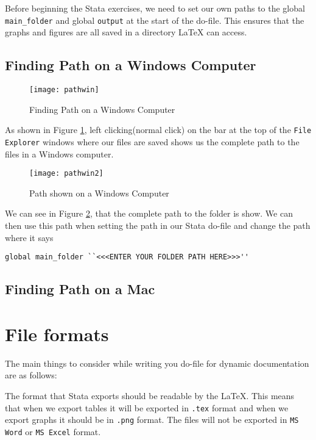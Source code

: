 \documentclass[]{article}
\begin{document}
Before beginning the Stata exercises, we need to set our own paths to the global \texttt{main\_folder} and global \texttt{output} at the start of the do-file. This ensures that the graphs and figures are all saved in a directory {\LaTeX} can access. 

\subsection*{Finding Path on a Windows Computer}



\begin{figure}[H]
	\centering
	\texttt{[image: pathwin]}
	\caption{Finding Path on a Windows Computer}
	\label{fig:pathwin}
\end{figure}

As shown in Figure \ref{fig:pathwin}, left clicking(normal click) on the bar at the top of the \texttt{File Explorer} windows where our files are saved shows us the complete path to the files in a Windows computer. \\

\begin{figure}[H]
	\centering
	\texttt{[image: pathwin2]}
	\caption{Path shown on a Windows Computer}
	\label{fig:pathwin2}
\end{figure}

We can see in Figure \ref{fig:pathwin2}, that the complete path to the folder is show. We can then use this path when setting the path in our Stata do-file and change the path where it says \begin{verbatim}
global main_folder ``<<<ENTER YOUR FOLDER PATH HERE>>>''
\end{verbatim} 

\subsection*{Finding Path on a Mac}


\section*{File formats}
The main things to consider while writing you do-file for dynamic documentation are as follows: 

The format that Stata exports should be readable by the {\LaTeX}. This means that when we export tables it will be exported in \texttt{.tex} format and when we export graphs it should be in \texttt{.png} format. 
The files will not be exported in \texttt{MS Word} or \texttt{MS Excel} format.
\end{document}
